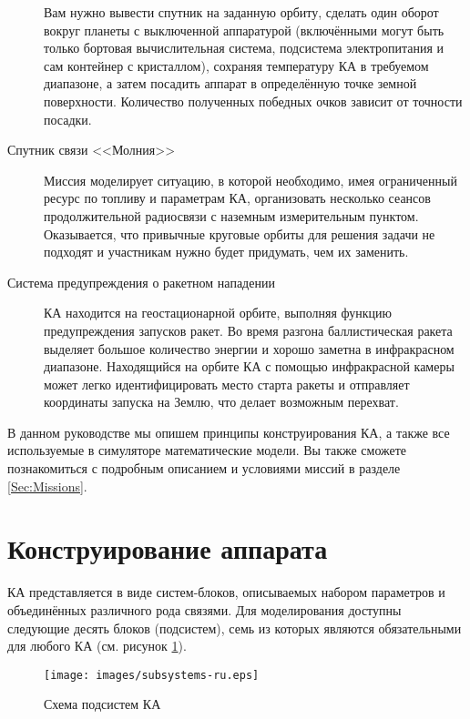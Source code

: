 \documentclass[12pt,a4paper]{article}
\begin{document}
\begin{description}
    Вам нужно вывести спутник на заданную орбиту, сделать один оборот вокруг планеты с
    выключенной аппаратурой (включёнными могут быть только бортовая вычислительная
    система, подсистема электропитания и сам контейнер с кристаллом), сохраняя температуру
    КА в требуемом диапазоне, а затем посадить аппарат в определённую точке земной
    поверхности. Количество полученных победных очков зависит от точности посадки.
  \item[Спутник связи <<Молния>>] Миссия моделирует ситуацию, в которой необходимо, имея
    ограниченный ресурс по топливу и параметрам КА, организовать несколько сеансов
    продолжительной радиосвязи с наземным измерительным пунктом. Оказывается, что
    привычные круговые орбиты для решения задачи не подходят и участникам нужно будет
    придумать, чем их заменить.
  \item[Система предупреждения о ракетном нападении] КА находится на геостационарной
    орбите, выполняя функцию предупреждения запусков ракет. Во время разгона
    баллистическая ракета выделяет большое количество энергии и хорошо заметна в
    инфракрасном диапазоне. Находящийся на орбите КА с помощью инфракрасной камеры может
    легко идентифицировать место старта ракеты и отправляет координаты запуска на Землю,
    что делает возможным перехват.
\end{description}

В данном руководстве мы опишем принципы конструирования КА, а также все используемые в
симуляторе математические модели. Вы также сможете познакомиться с подробным описанием и
условиями миссий в разделе \ref{Sec:Missions}.

\section{Конструирование аппарата}

КА представляется в виде систем-блоков, описываемых набором параметров и объединённых
различного рода связями. Для моделирования доступны следующие десять блоков (подсистем),
семь из которых являются обязательными для любого КА (см. рисунок \ref{Pic:subsystems}).

\begin{figure}[tbh]
  \begin{center}
    \texttt{[image: images/subsystems-ru.eps]}
    \caption{Схема подсистем КА}
    \label{Pic:subsystems}
  \end{center}
\end{figure}
\end{document}
